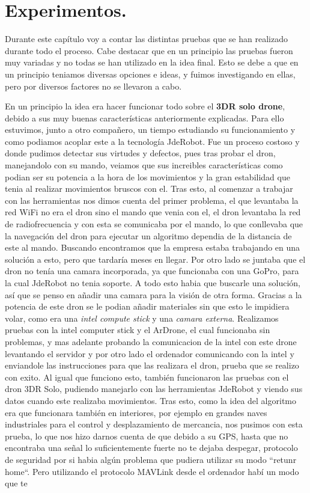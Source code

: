 \chapter{Experimentos.}\label{cap.experimentos}
\hspace{1cm} Durante este cap\'itulo voy a contar las distintas pruebas que se han realizado durante todo el proceso. Cabe destacar que en un principio las pruebas fueron muy variadas y no todas se han utilizado en la idea final. Esto se debe a que en un principio teniamos diversas opciones e ideas, y fuimos investigando en ellas, pero por diversos factores no se llevaron a cabo. 

\hspace{1cm} En un principio la idea era hacer funcionar todo sobre el \textbf{3DR solo drone}, debido a sus muy buenas caracter\'isticas anteriormente explicadas. Para ello estuvimos, junto a otro compañero, un tiempo estudiando su funcionamiento y como podiamos acoplar este a la tecnolog\'ia JdeRobot. Fue un proceso costoso y donde pudimos detectar sus virtudes y defectos, pues tras probar el dron, manejandolo con su mando, veiamos que sus increibles caracter\'isticas como podian ser su potencia a la hora de los movimientos y la gran estabilidad que tenia al realizar movimientos bruscos con el. Tras esto, al comenzar a trabajar con las herramientas nos dimos cuenta del primer problema, el que levantaba la red WiFi no era el dron sino el mando que venia con el, el dron levantaba la red de radiofrecuencia y con esta se comunicaba por el mando, lo que conllevaba que la navegaci\'on del dron para ejecutar un algoritmo dependia de la distancia de este al mando. Buscando encontramos que la empresa estaba trabajando en una soluci\'on a esto, pero que tardar\'ia meses en llegar. Por otro lado se juntaba que el dron no ten\'ia una camara incorporada, ya que funcionaba con una GoPro, para la cual JdeRobot no tenia soporte. A todo esto habia que buscarle una soluci\'on, as\'i que se penso en añadir una camara para la visi\'on de otra forma. Gracias a la potencia de este dron se le podian añadir materiales sin que esto le impidiera volar, como era una \textit{intel compute stick} y una \textit{camara externa}. Realizamos pruebas con la intel computer stick y el ArDrone, el cual funcionaba sin problemas, y mas adelante probando la comunicacion de la intel con este drone levantando el servidor y por otro lado el ordenador comunicando con la intel y enviandole las instrucciones para que las realizara el dron, prueba que se realizo con exito. Al igual que funciono esto, tambi\'en funcionaron las pruebas con el dron 3DR Solo, pudiendo manejarlo con las herramientas JdeRobot y viendo sus datos cuando este realizaba movimientos. Tras esto, como la idea del algoritmo era que funcionara tambi\'en en interiores, por ejemplo en grandes naves industriales para el control y desplazamiento de mercancia, nos pusimos con esta prueba, lo que nos hizo darnos cuenta de que debido a su GPS, hasta que no encontraba una señal lo suficientemente fuerte no te dejaba despegar, protocolo de seguridad por si habia alg\'un problema que pudiera utilizar su modo ``retunr home``. Pero utilizando el protocolo MAVLink desde el ordenador hab\'i un modo que te 